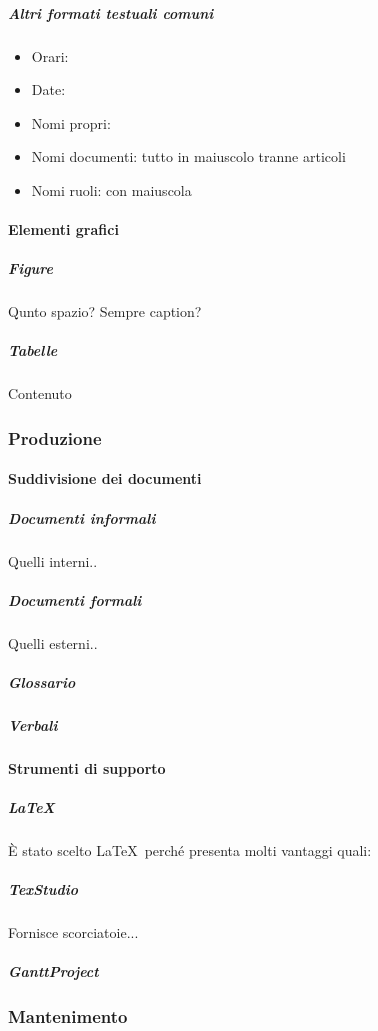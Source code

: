 			\subparagraph{Altri formati testuali comuni} %
			\begin{itemize}
				\item Orari: 
				\item Date:
				\item Nomi propri:
				\item Nomi documenti: tutto in maiuscolo tranne articoli
				\item Nomi ruoli: con maiuscola
			\end{itemize}



			\paragraph{Elementi grafici}

			\subparagraph{Figure}
			Qunto spazio? Sempre caption?

			\subparagraph{Tabelle}
			Contenuto



		\subsubsection{Produzione}

			\paragraph{Suddivisione dei documenti}

			\subparagraph{Documenti informali}
			Quelli interni..

			\subparagraph{Documenti formali}
			Quelli esterni..

			\subparagraph{Glossario}

			\subparagraph{Verbali}



			\paragraph{Strumenti di supporto}

			\subparagraph{\LaTeX}
			È stato scelto \LaTeX \ perché presenta molti vantaggi quali:

			\subparagraph{TexStudio}
			Fornisce scorciatoie...

			\subparagraph{GanttProject}
			
			

		\subsubsection{Mantenimento}

